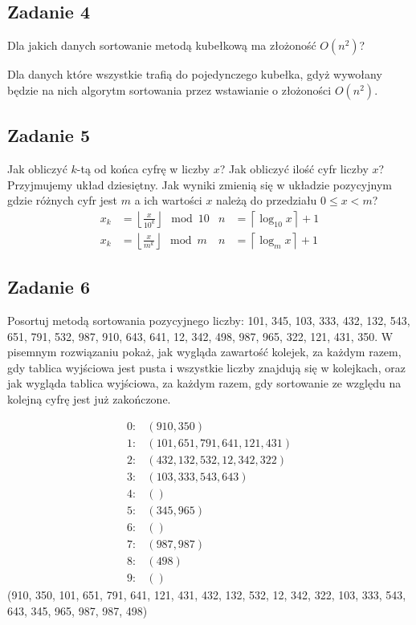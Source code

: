 \documentclass{article}
\begin{document}
\subsection*{Zadanie 4}
Dla jakich danych sortowanie metodą kubełkową ma złożoność $O(n^2)$?
\begin{center}
    Dla danych które wszystkie trafią do pojedynczego kubełka, gdyż wywołany będzie na nich
    algorytm sortowania przez wstawianie o złożoności $O(n^2)$.
\end{center}

\subsection*{Zadanie 5}
Jak obliczyć $k$-tą od końca cyfrę w liczby $x$? Jak obliczyć ilość cyfr liczby $x$? Przyjmujemy
układ dziesiętny. Jak wyniki zmienią się w układzie pozycyjnym gdzie różnych cyfr jest $m$ a ich
wartości $x$ należą do przedziału $0 \leq x < m$?
\begin{align*}
    x_k & = \left \lfloor \frac{x}{10^k} \right \rfloor \mod 10 & n & = \left \lceil \log_{10} x \right \rceil + 1 \\
    x_k & = \left \lfloor \frac{x}{m^k} \right \rfloor \mod m   & n & = \left \lceil \log_m x \right \rceil + 1
\end{align*}

\pagebreak
\subsection*{Zadanie 6}
Posortuj metodą sortowania pozycyjnego liczby: 101, 345, 103, 333, 432, 132, 543, 651,
791, 532, 987, 910, 643, 641, 12, 342, 498, 987, 965, 322, 121, 431, 350. W pisemnym
rozwiązaniu pokaż, jak wygląda zawartość kolejek, za każdym razem, gdy tablica
wyjściowa jest pusta i wszystkie liczby znajdują się w kolejkach, oraz jak wygląda
tablica wyjściowa, za każdym razem, gdy sortowanie ze względu na kolejną cyfrę jest już zakończone.

\begin{align*}
    0: & \left(910, 350\right)                     \\
    1: & \left(101, 651, 791, 641, 121, 431\right) \\
    2: & \left(432, 132, 532, 12, 342, 322\right)  \\
    3: & \left(103, 333, 543, 643\right)           \\
    4: & \left(\right)                             \\
    5: & \left(345, 965\right)                     \\
    6: & \left(\right)                             \\
    7: & \left(987, 987\right)                     \\
    8: & \left(498\right)                          \\
    9: & \left(\right)
\end{align*}
(910, 350, 101, 651, 791, 641, 121, 431, 432, 132, 532, 12, 342, 322, 103, 333, 543, 643, 345, 965, 987, 987, 498)
\end{document}
